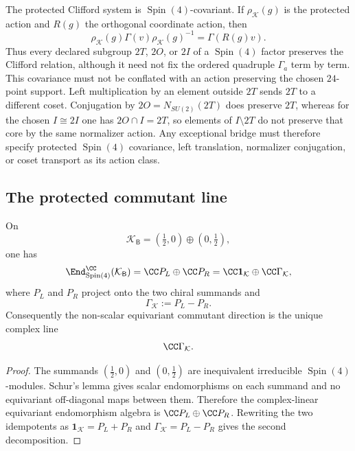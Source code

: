 \documentclass[11pt]{article}
\begin{document}
\begin{remark}
\label{p1:rem:s3one-exceptional-action-contract}
The protected Clifford system is \(\operatorname{Spin}(4)\)-covariant.  If
\(\rho_{\mathcal K}(g)\) is the protected action and \(R(g)\) the orthogonal
coordinate action, then
\[
 \rho_{\mathcal K}(g)\Gamma(v)\rho_{\mathcal K}(g)^{-1}
 =\Gamma(R(g)v).
\]
Thus every declared subgroup \(2T\), \(2O\), or \(2I\) of a \(\operatorname{Spin}(4)\)
factor preserves the Clifford relation, although it need not fix the ordered
quadruple \(\Gamma_a\) term by term.  This covariance must not be conflated
with an action preserving the chosen \(24\)-point support.  Left multiplication
by an element outside \(2T\) sends \(2T\) to a different coset.  Conjugation
by \(2O=N_{SU(2)}(2T)\) does preserve \(2T\), whereas for the chosen
\(I\cong2I\) one has \(2O\cap I=2T\), so elements of \(I\setminus2T\)
do not preserve that core by the same normalizer action.  Any exceptional
bridge must therefore specify protected \(\operatorname{Spin}(4)\) covariance, left
translation, normalizer conjugation, or coset transport as its action class.
\end{remark}

\subsection{The protected commutant line}

\begin{theorem}
\label{p1:thm:s3one-commutant-line}
On
\[
    \mathcal K_{\mathsf B}
    =
    (\tfrac12,0)\oplus(0,\tfrac12),
\]
one has
\[
    \End_{\operatorname{Spin}(4)}^{\CC}(\mathcal K_{\mathsf B})
    =
    \CC P_L\oplus\CC P_R
    =
    \CC\mathbf 1_{\mathcal K}\oplus\CC\Gamma_{\mathcal K},
\]
where \(P_L\) and \(P_R\) project onto the two chiral summands and
\[
    \Gamma_{\mathcal K}:=P_L-P_R.
\]
Consequently the non-scalar equivariant commutant direction is the unique complex
line
\[
    \CC\Gamma_{\mathcal K}.
\]
\end{theorem}

\begin{proof}
The summands \((\tfrac12,0)\) and \((0,\tfrac12)\) are inequivalent irreducible
\(\operatorname{Spin}(4)\)-modules.  Schur's lemma gives scalar endomorphisms on each summand
and no equivariant off-diagonal maps between them.  Therefore the complex-linear equivariant
endomorphism algebra is \(\CC P_L\oplus\CC P_R\).  Rewriting the two idempotents as
\(\mathbf 1_{\mathcal K}=P_L+P_R\) and \(\Gamma_{\mathcal K}=P_L-P_R\) gives the
second decomposition.
\end{proof}
\end{document}
